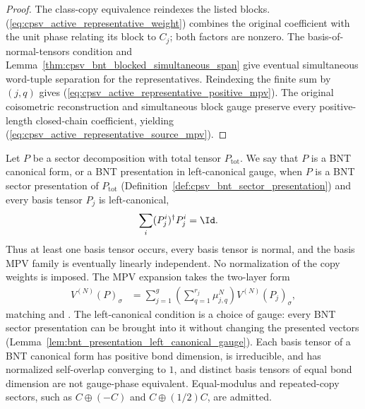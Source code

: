 \begin{proof}\leanok
    The class-copy equivalence reindexes the listed blocks.
    (\ref{eq:cpsv_active_representative_weight}) combines the original
    coefficient with the unit phase relating its block to $C_j$; both factors
    are nonzero. The basis-of-normal-tensors condition and
    Lemma~\ref{thm:cpsv_bnt_blocked_simultaneous_span} give eventual
    simultaneous word-tuple separation for the representatives. Reindexing
    the finite sum by $(j,q)$
    gives (\ref{eq:cpsv_active_representative_positive_mpv}).
    The original coisometric reconstruction and simultaneous block gauge
    preserve every positive-length closed-chain coefficient, yielding
    (\ref{eq:cpsv_active_representative_source_mpv}).
\end{proof}

\begin{definition}%
    \label{def:sector_bnt_cf}
    \leanok
    Let $P$ be a sector decomposition with total tensor $P_{\mathrm{tot}}$.
    We say that $P$ is a BNT canonical form, or a BNT presentation in
    left-canonical gauge, when $P$ is a BNT sector presentation of
    $P_{\mathrm{tot}}$ (Definition~\ref{def:cpsv_bnt_sector_presentation})
    and every basis tensor $P_j$ is left-canonical,
    \begin{align}
        \sum_i (P_j^i)^\dagger P_j^i & = \Id. \notag
    \end{align}
    Thus at least one basis tensor occurs, every basis tensor is normal, and
    the basis MPV family is eventually linearly independent. No normalization
    of the copy weights is imposed. The MPV expansion takes the two-layer form
    \begin{align}
        V^{(N)}(P)_\sigma
         & =
        \sum_{j=1}^{g}
        \left(\sum_{q=1}^{r_j} \mu_{j,q}^N\right)
        V^{(N)}(P_j)_\sigma,
        \label{eq:bnt_sector_raw_expansion}
    \end{align}
    matching \cite[Section~2.3]{Cirac2016MPDO_arXiv} and
    \cite[Definition~IV.2]{Cirac2021Matrix}. The left-canonical condition is
    a choice of gauge: every BNT sector presentation can be brought into it
    without changing the presented vectors
    (Lemma~\ref{lem:bnt_presentation_left_canonical_gauge}). Each basis
    tensor of a BNT canonical form has positive bond dimension, is
    irreducible, and has normalized self-overlap converging to $1$, and
    distinct basis tensors of equal bond dimension are not gauge-phase
    equivalent. Equal-modulus and repeated-copy sectors, such as
    $C \oplus (-C)$ and $C \oplus (1/2) C$, are admitted.
\end{definition}


